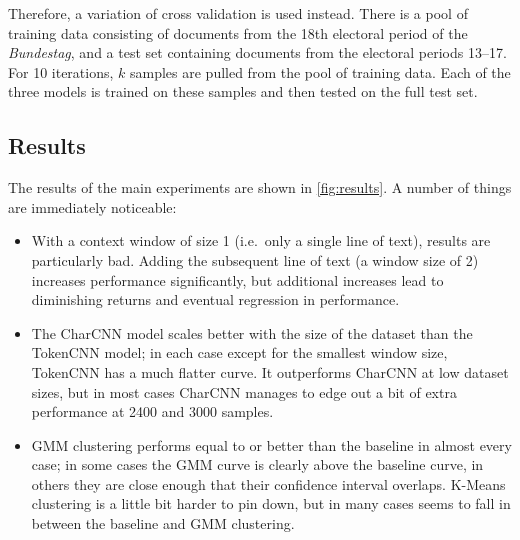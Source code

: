 Therefore, a variation of cross validation is used instead. There is a pool of
training data consisting of documents from the 18th electoral period of the
\emph{Bundestag}, and a test set containing documents from the
electoral periods \numrange{13}{17}.
For 10 iterations, $k$ samples are pulled from the pool of training data. Each
of the three models is trained on these samples and then tested on the full test
set.

\subsection{Results}
The results of the main experiments are shown in \cref{fig:results}.
A number of things are immediately noticeable:
\begin{itemize}
  \item With a context window of size 1 (i.e.\ only a single line of text),
    results are particularly bad. Adding the subsequent line of text (a window
    size of 2) increases performance significantly, but additional increases
    lead to diminishing returns and eventual regression in performance.
  \item The CharCNN model scales better with the size of the dataset than the
    TokenCNN model; in each case except for the smallest window size, TokenCNN
    has a much flatter curve. It outperforms CharCNN at low dataset sizes, but
    in most cases CharCNN manages to edge out a bit of extra performance at 2400
    and 3000 samples.
  \item GMM clustering performs equal to or better than the baseline in almost
    every case; in some cases the GMM curve is clearly above the baseline curve,
    in others they are close enough that their confidence interval overlaps.
    K-Means clustering is a little bit harder to pin down, but in many cases
    seems to fall in between the baseline and GMM clustering.
\end{itemize}

